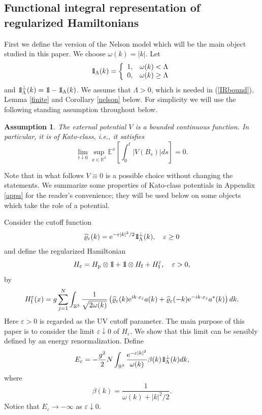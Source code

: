 \documentclass[12pt]{article}
\newtheorem{lemma}[theorem]{Lemma}
\newtheorem{assumption}[theorem]{Assumption}
\newcommand{\bl}[1]{\begin{lemma}\label{#1}}
\newcommand{\el}{\end{lemma}}
\def\bbbone{{\mathchoice {\rm 1\mskip-4mu l} {\rm 1\mskip-4mu l}
{\rm 1\mskip-4.5mu l} {\rm 1\mskip-5mu l}}}
\def\one{\bbbone}
\newcommand{\kp}{\one_\Lambda^\perp(k)}
\newcommand{\Ebb}{{\mathbb E}}
\providecommand{\eq}[1]{\begin{equation}\label{#1}}
\providecommand{\en}{\end{equation}}
\providecommand{\qed}{\hfill {$\Box$}\par\medskip}
\providecommand{\BR}{{\mathbb{R}^3 }}
\providecommand{\RR}{\mathbb{R}}
\providecommand{\kak}[1]{(\ref{#1})}
\providecommand{\hn}{H}%
\providecommand{\is}{\inf \s}
\providecommand{\lkk}{\left\{}
\providecommand{\add}{a^\ast}
\providecommand{\hf}{H_{\rm f}}
\providecommand{\hi}{H_{\rm I}}
\providecommand{\hp}{H_{\rm p}}
\providecommand{\la}{{\Lambda}}
\providecommand{\s}{\sigma}
\providecommand{\vpe}{{\widehat \varrho_\eps}}
\providecommand{\e}{{\rm e}}
\providecommand{\1}{\mathbb{1}}
\providecommand {\s}  {\ensuremath {\mathcal{S}}}
\providecommand{\eps}{\varepsilon}
\newcounter {constant}
\begin{document}
\subsection{Functional integral representation of  regularized Hamiltonians}
First we define the version of the Nelson model which will be the main object studied in this paper. We choose
$\omega(k)=|k|$. Let
$$
\one_\la(k) =
\lkk
\begin{array}{ll}
1,& \omega(k) < \la \\
0,& \omega(k)\geq\la
\end{array}
\right.
$$
and $\kp=\one-\one_\la(k)$. We assume that  $\Lambda> 0$, which is needed in \kak{IRbound},  Lemma
\ref{finite} and Corollary \ref{nelson} below. For simplicity we will use the following standing assumption
throughout below.
\begin{assumption}
The external potential $V$ is a bounded continuous function. In particular, it is of Kato-class, i.e.,
it satisfies
\eq{kato11}
\lim_{t\downarrow 0}\sup_{x\in\RR^3} \Ebb^x\!\left [\int_0^t |V(B_s)|ds\right ]=0.
\en
\end{assumption}
Note that in what follows $V\equiv 0$ is a possible choice without changing the statements. We summarize
some properties of Kato-class potentials in Appendix \ref{appa} for the reader's convenience; they will be
used below on some objects which take the role of a potential.

Consider the cutoff function
\eq{sasa3}
\vpe(k)=\e^{-\eps|k|^2/2}\kp,\quad \eps\geq0
\en
and define the regularized Hamiltonian
\begin{equation}
\hn_\eps = \hp\otimes \one +\one \otimes \hf  + \hi^\eps,\quad \eps>0,
\end{equation}
by
\begin{equation}
\hi^\eps(x)  = g\sum_{j=1}^N \int_\BR
\frac{1}{\sqrt{2\omega(k)}} \left( \vpe (k)\e^{ik\cdot x_j}
 a(k) + \vpe (-k)\e^{-ik\cdot x_j}  \add(k)\right)  dk.
\end{equation}
Here $\eps>0$ is regarded as the UV cutoff parameter. The main purpose of this paper is to
consider the limit $\eps\downarrow 0$ of $\hn_\eps$. We show that this limit can be sensibly defined
by an energy renormalization. Define
\eq{sasa6}
E_\eps=-\frac{g^2}{2} N \int_{\BR} \frac{\e^{-\eps|k|^2}}{\omega(k)}\beta(k)\kp dk,
\en
where
\eq{beta}
\beta(k)=\frac{1}{\omega(k)+|k|^2/2}.
\en
Notice  that $E_\eps\to-\infty$ as $\eps\downarrow 0$.
\end{document}
